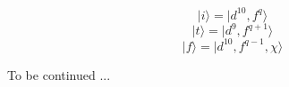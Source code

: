 \documentclass[a4paper,oneside,12pt]{extarticle}
\begin{document}
$$
|i\rangle = | d^{10},f^q \rangle
$$
$$
|t\rangle = | d^9, f^{q+1} \rangle
$$
$$ 
| f \rangle = | d^{10}, f^{q-1}, \chi \rangle
$$

To be continued ...

\newpage



%
%
\end{document}
